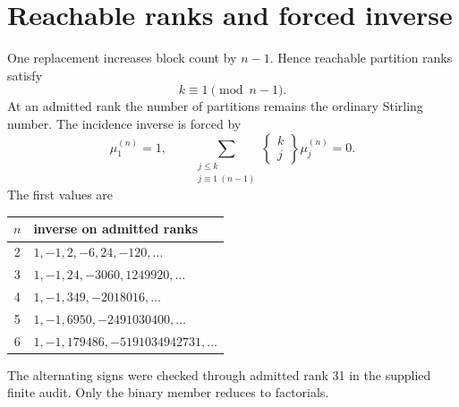 \documentclass[11pt,a4paper]{article}
\begin{document}
\section{Reachable ranks and forced inverse}
One replacement increases block count by $n-1$. Hence reachable partition ranks satisfy
\begin{equation}
k\equiv1\pmod{n-1}.
\end{equation}
At an admitted rank the number of partitions remains the ordinary Stirling number. The incidence inverse is forced by
\begin{equation}
\mu_1^{(n)}=1,\qquad
\sum_{\substack{j\le k\\j\equiv1\ (n-1)}}
\left\{\begin{matrix}k\\j\end{matrix}\right\}\mu_j^{(n)}=0.
\end{equation}
The first values are
\begin{center}
\begin{tabular}{cl}
\toprule
$n$&inverse on admitted ranks\\\midrule
2&$1,-1,2,-6,24,-120,\ldots$\\
3&$1,-1,24,-3060,1249920,\ldots$\\
4&$1,-1,349,-2018016,\ldots$\\
5&$1,-1,6950,-2491030400,\ldots$\\
6&$1,-1,179486,-5191034942731,\ldots$\\
\bottomrule
\end{tabular}
\end{center}
The alternating signs were checked through admitted rank 31 in the supplied finite audit. Only the binary member reduces to factorials.
\end{document}
